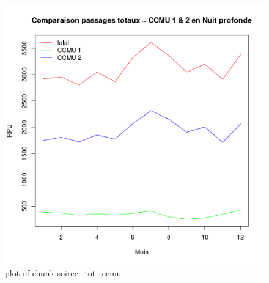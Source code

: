 \begin{figure}[htbp]
\centering
\includegraphics{figure/soiree_tot_ccmu2.png}
\caption{plot of chunk soiree\_tot\_ccmu}
\end{figure}

